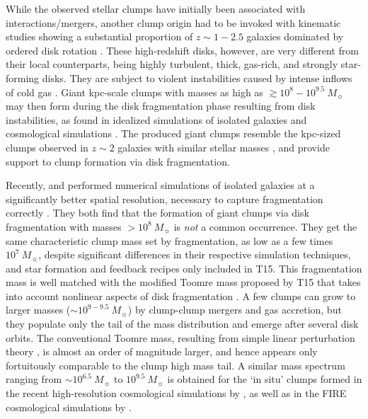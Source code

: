 \documentclass[twocolumn]{aastex61}
\begin{document}
While the observed stellar clumps have initially been associated with 
interactions/mergers, another clump origin had to be invoked with kinematic 
studies showing a substantial proportion of $z\sim 1-2.5$ galaxies dominated by 
ordered disk rotation \citep{forster09,wisnioski15,rodrigues16}. These 
high-redshift disks, however, are very different from their local counterparts, 
being highly turbulent, thick, gas-rich, and strongly star-forming disks. They 
are subject to violent instabilities \citep{dekel09b} caused by intense inflows 
of cold gas \citep{keres05,ocvirk08,dekel09a}. Giant kpc-scale clumps with 
masses as high as $\gtrsim 10^8-10^{9.5}~M_{\sun}$ may then form during the disk 
fragmentation phase resulting from disk instabilities, as found in idealized 
simulations of isolated galaxies and cosmological simulations 
\citep{agertz09,bournaud10,bournaud14,ceverino10,ceverino12,genel12,mandelker14}. 
The produced giant clumps resemble the kpc-sized clumps observed in $z\sim 2$ 
galaxies with similar stellar masses
\citep{forster11,guo12}, and provide support to clump formation via disk 
fragmentation.

Recently, \citet[][hereafter T15]{tamburello15} and \citet{behrendt16} performed 
numerical simulations of isolated galaxies at a significantly better spatial 
resolution, 
necessary to capture fragmentation correctly \citep{mayer08}. They both find 
that the formation of giant clumps via disk fragmentation with masses 
$>10^8~M_{\sun}$ is {\em not} a common occurrence. They get the same
characteristic clump mass set by fragmentation, as low as a few times 
$10^7~M_{\sun}$, despite significant differences in their respective simulation 
techniques, 
and star formation and feedback recipes only included in T15. This fragmentation 
mass is well matched with the modified Toomre mass proposed by T15 that takes 
into account nonlinear aspects of disk fragmentation \citep{boley10}. A few 
clumps can grow to larger masses ($\sim 10^{9-9.5}~M_{\sun}$) by clump-clump 
mergers and gas accretion, but they populate only the tail of the mass 
distribution and emerge after several disk orbits. The conventional Toomre mass, 
resulting from simple linear perturbation theory \citep{toomre64}, is almost an 
order of magnitude larger, and hence appears only fortuitously comparable to the 
clump high mass tail.
A similar mass spectrum ranging from $\sim 10^{6.5}~M_{\sun}$ to 
$10^{9.5}~M_{\sun}$ is obtained for the `in situ' clumps formed in the recent 
high-resolution cosmological simulations by \citet{mandelker17}, as well as in 
the FIRE cosmological simulations by \citet{oklopcic17}.
\end{document}
